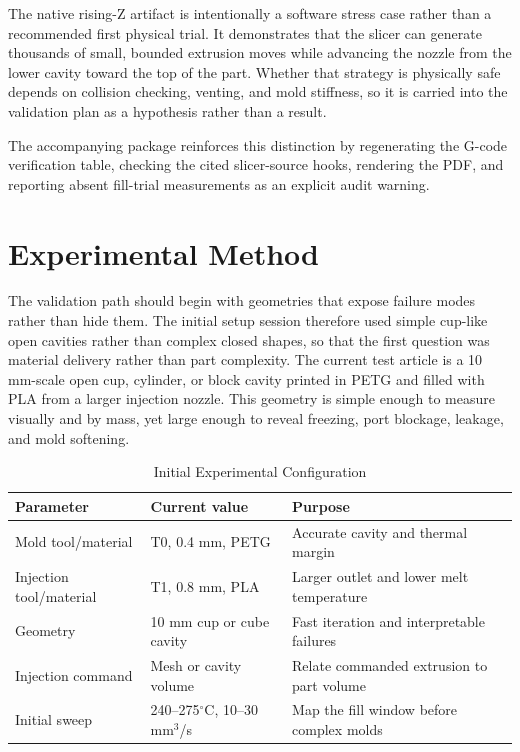 \documentclass[conference]{IEEEtran}
\newcommand{\toolone}{T0}
\newcommand{\tooltwo}{T1}
\begin{document}
The native rising-Z artifact is intentionally a software stress case rather than a recommended first physical trial. It demonstrates that the slicer can generate thousands of small, bounded extrusion moves while advancing the nozzle from the lower cavity toward the top of the part. Whether that strategy is physically safe depends on collision checking, venting, and mold stiffness, so it is carried into the validation plan as a hypothesis rather than a result.

The accompanying package reinforces this distinction by regenerating the G-code verification table, checking the cited slicer-source hooks, rendering the PDF, and reporting absent fill-trial measurements as an explicit audit warning.

\section{Experimental Method}
The validation path should begin with geometries that expose failure modes rather than hide them. The initial setup session therefore used simple cup-like open cavities rather than complex closed shapes, so that the first question was material delivery rather than part complexity. The current test article is a 10 mm-scale open cup, cylinder, or block cavity printed in PETG and filled with PLA from a larger injection nozzle. This geometry is simple enough to measure visually and by mass, yet large enough to reveal freezing, port blockage, leakage, and mold softening.

\begin{table}[t]
\caption{Initial Experimental Configuration}
\label{tab:config}
\centering
\scriptsize
\setlength{\tabcolsep}{2.2pt}
\begin{tabularx}{\columnwidth}{@{}p{}p{}Y@{}}
\toprule
Parameter & Current value & Purpose \\
\midrule
Mold tool/material & \toolone, 0.4 mm, PETG & Accurate cavity and thermal margin \\
Injection tool/material & \tooltwo, 0.8 mm, PLA & Larger outlet and lower melt temperature \\
Geometry & 10 mm cup or cube cavity & Fast iteration and interpretable failures \\
Injection command & Mesh or cavity volume & Relate commanded extrusion to part volume \\
Initial sweep & 240--275$^\circ$C, 10--30 mm$^3$/s & Map the fill window before complex molds \\
\bottomrule
\end{tabularx}
\end{table}
\end{document}
